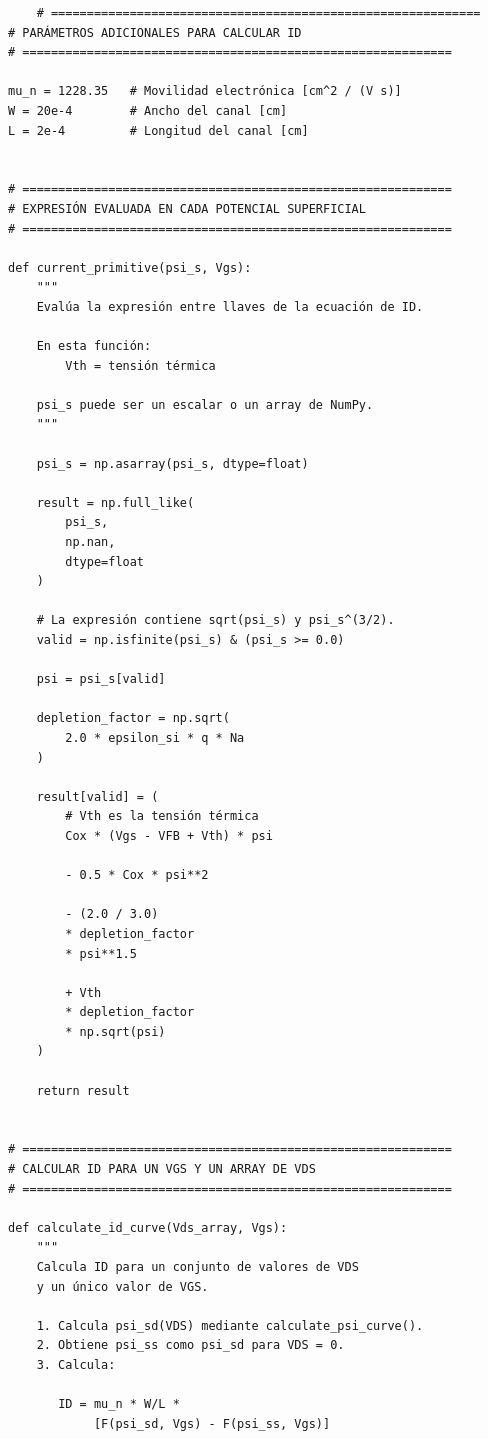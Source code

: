 \documentclass[a4paper, twoside, 10pt, spanish]{article}
\numberwithin{table}{section}
\begin{document}
\begin{verbatim}
    # ============================================================
# PARÁMETROS ADICIONALES PARA CALCULAR ID
# ============================================================

mu_n = 1228.35   # Movilidad electrónica [cm^2 / (V s)]
W = 20e-4        # Ancho del canal [cm]
L = 2e-4         # Longitud del canal [cm]


# ============================================================
# EXPRESIÓN EVALUADA EN CADA POTENCIAL SUPERFICIAL
# ============================================================

def current_primitive(psi_s, Vgs):
    """
    Evalúa la expresión entre llaves de la ecuación de ID.

    En esta función:
        Vth = tensión térmica

    psi_s puede ser un escalar o un array de NumPy.
    """

    psi_s = np.asarray(psi_s, dtype=float)

    result = np.full_like(
        psi_s,
        np.nan,
        dtype=float
    )

    # La expresión contiene sqrt(psi_s) y psi_s^(3/2).
    valid = np.isfinite(psi_s) & (psi_s >= 0.0)

    psi = psi_s[valid]

    depletion_factor = np.sqrt(
        2.0 * epsilon_si * q * Na
    )

    result[valid] = (
        # Vth es la tensión térmica
        Cox * (Vgs - VFB + Vth) * psi

        - 0.5 * Cox * psi**2

        - (2.0 / 3.0)
        * depletion_factor
        * psi**1.5

        + Vth
        * depletion_factor
        * np.sqrt(psi)
    )

    return result


# ============================================================
# CALCULAR ID PARA UN VGS Y UN ARRAY DE VDS
# ============================================================

def calculate_id_curve(Vds_array, Vgs):
    """
    Calcula ID para un conjunto de valores de VDS
    y un único valor de VGS.

    1. Calcula psi_sd(VDS) mediante calculate_psi_curve().
    2. Obtiene psi_ss como psi_sd para VDS = 0.
    3. Calcula:

       ID = mu_n * W/L *
            [F(psi_sd, Vgs) - F(psi_ss, Vgs)]


\end{verbatim}
\end{document}

